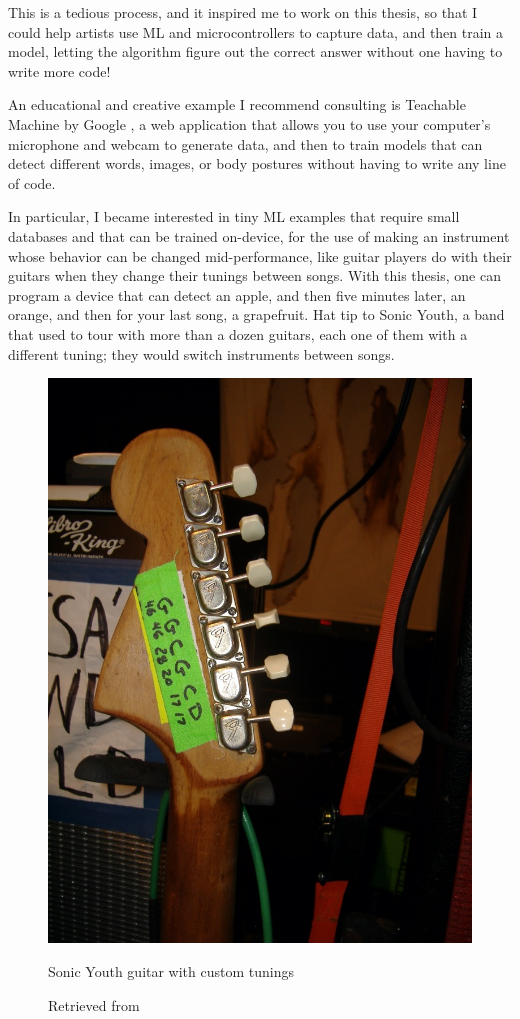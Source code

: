 This is a tedious process, and it inspired me to work on this thesis, so that I could help artists use \acrshort{ML} and microcontrollers to capture data, and then train a model, letting the algorithm figure out the correct answer without one having to write more code!

An educational and creative example I recommend consulting is Teachable Machine by Google \cite{website-google-teachable-machine}, a web application that allows you to use your computer's microphone and webcam to generate data, and then to train models that can detect different words, images, or body postures without having to write any line of code.

In particular, I became interested in tiny \acrshort{ML} examples that require small databases and that can be trained on-device, for the use of making an instrument whose behavior can be changed mid-performance, like guitar players do with their guitars when they change their tunings between songs. With this thesis, one can program a device that can detect an apple, and then five minutes later, an orange, and then for your last song, a grapefruit. Hat tip to Sonic Youth, a band that used to tour with more than a dozen guitars, each one of them with a different tuning; they would switch instruments between songs.

\begin{figure}[ht]
  \centering
  \includegraphics[width=0.75\linewidth,height=0.30\textheight,keepaspectratio]{images/sonic-youth-guitar.jpg}
  \caption{Sonic Youth guitar with custom tunings}
  \caption*{Retrieved from \cite{sonic-youth-illustrated-equipment-guide}}
  \label{fig:sonic-youth-guitar}
\end{figure}

